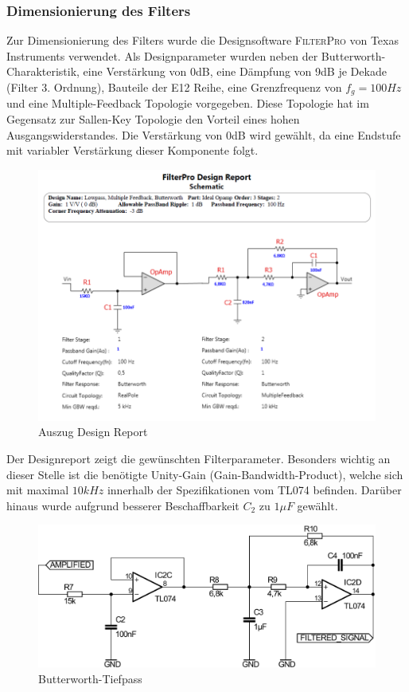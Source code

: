 \subsubsection{Dimensionierung des Filters}
Zur Dimensionierung des Filters wurde die Designsoftware \textsc{FilterPro} von Texas Instruments verwendet. Als Designparameter wurden neben der Butter\-worth-Charakteristik, eine Verstärkung von 0dB, eine Dämpfung von 9dB je Dekade (Filter 3. Ordnung), Bauteile der E12 Reihe, eine Grenzfrequenz von $f_g=100Hz$ und eine Multiple-Feedback Topologie vorgegeben. Diese Topologie hat im Gegensatz zur Sallen-Key Topologie den Vorteil eines hohen Ausgangswiderstandes. Die Verstärkung von 0dB wird gewählt, da eine Endstufe mit variabler Verstärkung dieser Komponente folgt.
\begin{figure}[H]
	\centering
	\includegraphics[scale=0.565]{gfx/Butterworth_FilterPro.png}
	\caption{Auszug Design Report}
	\label{fig:design_report}
\end{figure}
\noindent
Der Designreport zeigt die gewünschten Filterparameter. Besonders wichtig an dieser Stelle ist die benötigte Unity-Gain (Gain-Bandwidth-Product), welche sich mit maximal $10kHz$ innerhalb der Spezifikationen vom \textsc{TL074} befinden. Darüber hinaus wurde aufgrund besserer Beschaffbarkeit $C_2$ zu $1\mu F$ gewählt.
\begin{figure}[H]
	\centering
	\includegraphics[scale=0.5]{gfx/filter.pdf}
	\caption{Butterworth-Tiefpass}
\end{figure}
